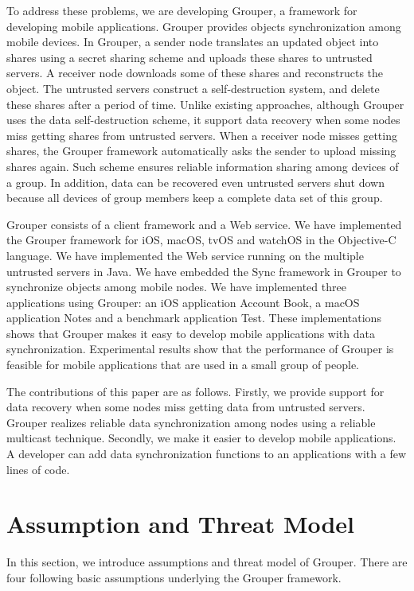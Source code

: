 \documentclass[twocolumn,10pt]{article}
\begin{document}
To address these problems, we are developing Grouper, a framework for developing mobile applications. 
Grouper provides objects synchronization among mobile devices.
In Grouper, a sender node translates an updated object into shares using a secret sharing scheme and uploads these shares to untrusted servers. 
A receiver node downloads some of these shares and reconstructs the object.
The untrusted servers construct a self-destruction system, and delete these shares after a period of time.
Unlike existing approaches, although Grouper uses the data self-destruction scheme, it support data recovery when some nodes miss getting shares from untrusted servers.
When a receiver node misses getting shares, the Grouper framework automatically asks the sender to upload missing shares again.
Such scheme ensures reliable information sharing among devices of a group.
In addition, data can be recovered even untrusted servers shut down because all devices of group members keep a complete data set of this group.

Grouper consists of a client framework and a Web service.
We have implemented the Grouper framework for iOS, macOS, tvOS and watchOS in the Objective-C language.
We have implemented the Web service running on the multiple untrusted servers in Java. 
We have embedded the Sync framework in Grouper to synchronize objects among mobile nodes.
We have implemented three applications using Grouper: an iOS application Account Book, a macOS application Notes and a benchmark application Test.
These implementations shows that Grouper makes it easy to develop mobile applications with data synchronization.
Experimental results show that the performance of Grouper is feasible for mobile applications that are used in a small group of people.

The contributions of this paper are as follows.
Firstly, we provide support for data recovery when some nodes miss getting data from untrusted servers.
Grouper realizes reliable data synchronization among nodes using a reliable multicast technique.
Secondly, we make it easier to develop mobile applications.
A developer can add data synchronization functions to an applications with a few lines of code.

\section{Assumption and Threat Model}

In this section, we introduce assumptions and threat model of Grouper.
There are four following basic assumptions underlying the Grouper framework.
\end{document}
